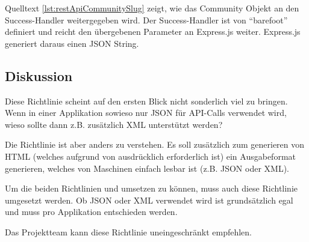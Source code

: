 Quelltext \ref{lst:restApiCommunitySlug} zeigt, wie das Community Objekt an den Success-Handler weitergegeben wird. Der Success-Handler ist von ``barefoot'' definiert und reicht den übergebenen Parameter an Express.js weiter. Express.js generiert daraus einen JSON String.

\subsection*{Diskussion}
Diese Richtlinie scheint auf den ersten Blick nicht sonderlich viel zu bringen. Wenn in einer Applikation sowieso nur JSON für API-Calls verwendet wird, wieso sollte dann z.B. zusätzlich XML unterstützt werden?

Die Richtlinie ist aber anders zu verstehen. Es soll zusätzlich zum generieren von HTML (welches aufgrund von  ausdrücklich erforderlich ist) ein Ausgabeformat generieren, welches von Maschinen einfach lesbar ist (z.B. JSON oder XML).

Um die beiden Richtlinien  und  umsetzen zu können, muss auch diese Richtlinie umgesetzt werden. Ob JSON oder XML verwendet wird ist grundsätzlich egal und muss pro Applikation entschieden werden.

Das Projektteam kann diese Richtlinie uneingeschränkt empfehlen.